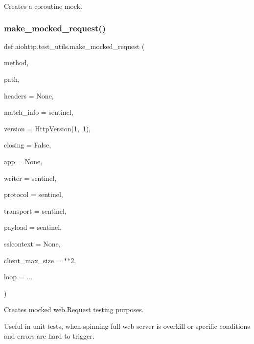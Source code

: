 \begin{DoxyVerb}Creates a coroutine mock.\end{DoxyVerb}
 \mbox{\label{namespaceaiohttp_1_1test__utils_a2ebaf0270b54d8cf8c9ee700d30bdc00}} 
\subsubsection{\texorpdfstring{make\+\_\+mocked\+\_\+request()}{make\_mocked\_request()}}
{\footnotesize\ttfamily def aiohttp.\+test\+\_\+utils.\+make\+\_\+mocked\+\_\+request (\begin{DoxyParamCaption}\item[{}]{method,  }\item[{}]{path,  }\item[{}]{headers = {\ttfamily None},  }\item[{}]{match\+\_\+info = {\ttfamily sentinel},  }\item[{}]{version = {\ttfamily HttpVersion(1,~1)},  }\item[{}]{closing = {\ttfamily False},  }\item[{}]{app = {\ttfamily None},  }\item[{}]{writer = {\ttfamily sentinel},  }\item[{}]{protocol = {\ttfamily sentinel},  }\item[{}]{transport = {\ttfamily sentinel},  }\item[{}]{payload = {\ttfamily sentinel},  }\item[{}]{sslcontext = {\ttfamily None},  }\item[{}]{client\+\_\+max\+\_\+size = {$\ast$$\ast$2},  }\item[{}]{loop = {\ttfamily ...} }\end{DoxyParamCaption})}

\begin{DoxyVerb}Creates mocked web.Request testing purposes.

Useful in unit tests, when spinning full web server is overkill or
specific conditions and errors are hard to trigger.\end{DoxyVerb}
 \mbox{\label{namespaceaiohttp_1_1test__utils_a78b60aab76f3be72e95f7cf4d6c84eaa}} 
